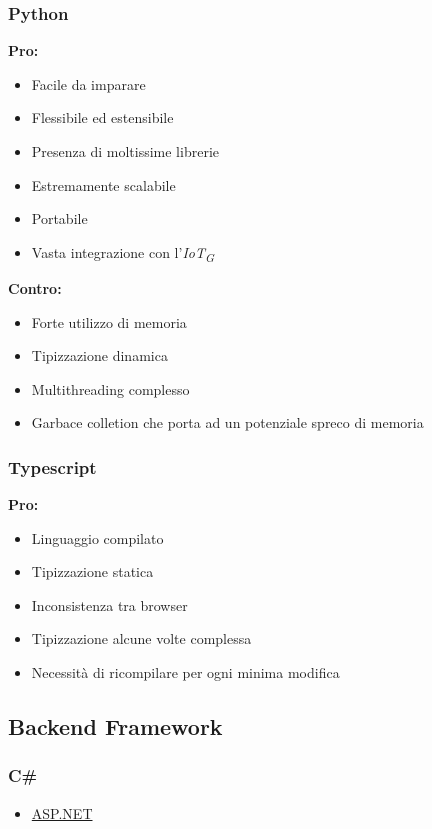\documentclass[a4paper, 12pt]{article}
\begin{document}
\subsubsection{Python}
\textbf{Pro:}
\begin{itemize}
    \item Facile da imparare
    \item Flessibile ed estensibile
    \item Presenza di moltissime librerie
    \item Estremamente scalabile
    \item Portabile
    \item Vasta integrazione con l'\textit{IoT\textsubscript{G}}
\end{itemize}
\vspace*{0.5cm}
\textbf{Contro:}
\begin{itemize}
    \item Forte utilizzo di memoria
    \item Tipizzazione dinamica
    \item Multithreading complesso
    \item Garbace colletion che porta ad un potenziale spreco di memoria
\end{itemize}
\subsubsection{Typescript}
\textbf{Pro:}
\begin{itemize}
    \item Linguaggio compilato
    \item Tipizzazione statica
\end{itemize}
\vspace*{0.5cm}
\begin{itemize}
    \item Inconsistenza tra browser
    \item Tipizzazione alcune volte complessa
    \item Necessità di ricompilare per ogni minima modifica
\end{itemize}
\subsection{Backend Framework}
\subsubsection{C\#}
\begin{itemize}
    \item \href{https://dotnet.microsoft.com/en-us/apps/aspnet}{ASP.NET}
\end{itemize}
\end{document}
